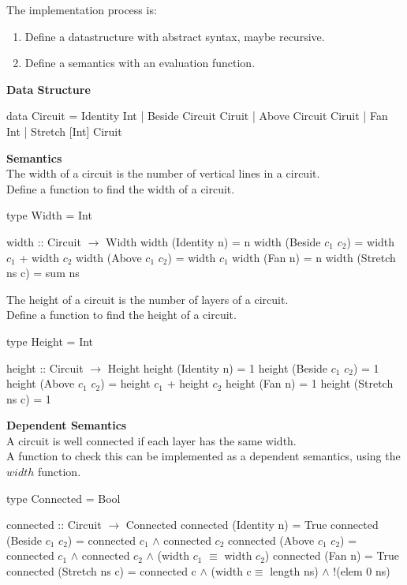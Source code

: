 \documentclass[11pt,a4paper]{article}
\begin{document}
The implementation process is:
\begin{enumerate}
  \item Define a datastructure with abstract syntax, maybe recursive.
  \item Define a semantics with an evaluation function.
\end{enumerate}

\textbf{Data Structure}
\begin{code}
data Circuit = Identity Int
             | Beside Circuit Ciruit
             | Above Circuit Ciruit
             | Fan Int
             | Stretch [Int] Ciruit
\end{code}

\textbf{Semantics}\\
The width of a circuit is the number of vertical lines in a circuit.\\
Define a function to find the width of a circuit.
\begin{code}
type Width = Int

width :: Circuit $\to$ Width
width (Identity n)   = n
width (Beside $c_1$ $c_2$)     = width $c_1$ + width $c_2$
width (Above $c_1$ $c_2$)      = width $c_1$
width (Fan n)        = n
width (Stretch ns c) = sum ns
\end{code}

The height of a circuit is the number of layers of a circuit.\\
Define a function to find the height of a circuit.
\begin{code}%
type Height = Int

height :: Circuit $\to$ Height
height (Identity n)   = 1
height (Beside $c_1$ $c_2$)     = 1
height (Above $c_1$ $c_2$)      = height $c_1$ + height $c_2$
height (Fan n)        = 1
height (Stretch ns c) = 1
\end{code}

\textbf{Dependent Semantics}\\
A circuit is well connected if each layer has the same width.\\
A function to check this can be implemented as a dependent semantics, using the $width$ function.
\begin{code}
type Connected = Bool

connected :: Circuit $\to$ Connected
connected (Identity n)   = True
connected (Beside $c_1$ $c_2$)     = connected $c_1$ $\wedge$ connected $c_2$
connected (Above $c_1$ $c_2$)      = connected $c_1$ $\wedge$ connected $c_2$
                         $\wedge$ (width $c_1$ $\equiv$ width $c_2$)
connected (Fan n)        = True
connected (Stretch ns c) = connected c $\wedge$ (width c$\equiv$ length ns)
                         $\wedge$ !(elem 0 ns)
\end{code}
\end{document}
